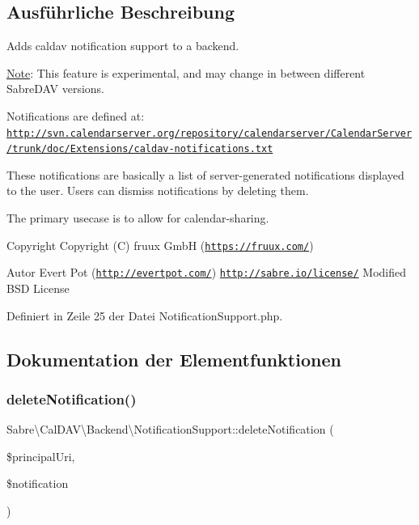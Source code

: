 \subsection{Ausführliche Beschreibung}
Adds caldav notification support to a backend.

\mbox{\hyperlink{class_note}{Note}}\+: This feature is experimental, and may change in between different Sabre\+D\+AV versions.

Notifications are defined at\+: \href{http://svn.calendarserver.org/repository/calendarserver/CalendarServer/trunk/doc/Extensions/caldav-notifications.txt}{\tt http\+://svn.\+calendarserver.\+org/repository/calendarserver/\+Calendar\+Server/trunk/doc/\+Extensions/caldav-\/notifications.\+txt}

These notifications are basically a list of server-\/generated notifications displayed to the user. Users can dismiss notifications by deleting them.

The primary usecase is to allow for calendar-\/sharing.

\begin{DoxyCopyright}{Copyright}
Copyright (C) fruux GmbH (\href{https://fruux.com/}{\tt https\+://fruux.\+com/}) 
\end{DoxyCopyright}
\begin{DoxyAuthor}{Autor}
Evert Pot (\href{http://evertpot.com/}{\tt http\+://evertpot.\+com/})  \href{http://sabre.io/license/}{\tt http\+://sabre.\+io/license/} Modified B\+SD License 
\end{DoxyAuthor}


Definiert in Zeile 25 der Datei Notification\+Support.\+php.



\subsection{Dokumentation der Elementfunktionen}
\mbox{\label{interface_sabre_1_1_cal_d_a_v_1_1_backend_1_1_notification_support_acb6eb34436a6dd471cdd963af285c22f}} 
\subsubsection{\texorpdfstring{delete\+Notification()}{deleteNotification()}}
{\footnotesize\ttfamily Sabre\textbackslash{}\+Cal\+D\+A\+V\textbackslash{}\+Backend\textbackslash{}\+Notification\+Support\+::delete\+Notification (\begin{DoxyParamCaption}\item[{}]{\$principal\+Uri,  }\item[{\mbox{\hyperlink{interface_sabre_1_1_cal_d_a_v_1_1_xml_1_1_notification_1_1_notification_interface}{Notification\+Interface}}}]{\$notification }\end{DoxyParamCaption})}

